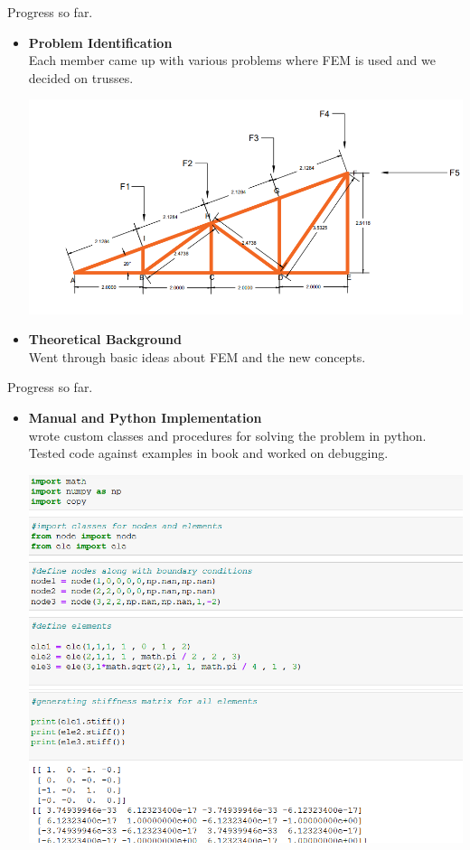 \documentclass{beamer}
\begin{document}
\begin{frame}[t]{Progress so far.}
	\begin{itemize}
		\item \textbf{Problem Identification}\\
			Each member came up with various problems where FEM is used and we decided on trusses.
			\begin{center}
					\includegraphics[width=0.8\linewidth]{truss}
			\end{center}
		
			
				\item \textbf{Theoretical Background}\\
			Went through basic ideas about FEM and the new concepts.
		\end{itemize}

\end{frame}

\begin{frame}[t]{Progress so far. }
	\begin{itemize}
		\item \textbf{Manual and Python Implementation}\\
		wrote custom classes and procedures for solving the problem in python. Tested code against examples in book and worked on  debugging.
		
		\begin{center}
			\includegraphics[width=0.85\linewidth]{defnode}
		\end{center}
			
	
	\end{itemize}
\end{frame}
\end{document}
